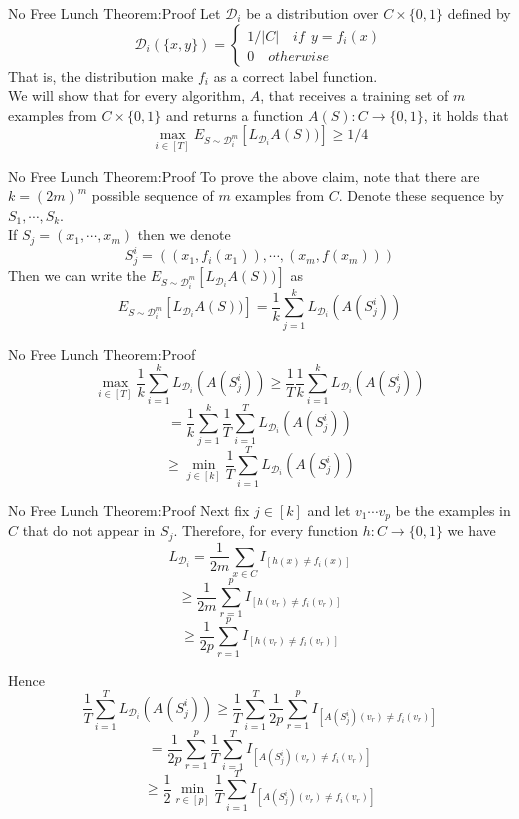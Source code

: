 \documentclass{beamer}
\begin{document}
\begin{frame}{No Free Lunch Theorem:Proof}
	Let $\mathcal{D}_i$ be a distribution over $C \times \{0,1\}$ defined by
	\[\mathcal{D}_i(\{x,y\}) = \begin{cases}
			1/|C| \quad if \ \ y=f_i(x) \\
			0 \quad otherwise
	\end{cases}\]
	That is, the distribution make $f_i$ as a correct label function. \\
	We will show that for every algorithm, $A$, that receives a training set of $m$ examples from $C \times \{0,1\}$ and returns a function $A(S): C \rightarrow \{0,1\}$, it holds that 
\[\max_{i \in [T]} E_{S \sim \mathcal{D}^m_i} [L_{\mathcal{D}_i} A(S))] \geq 1/4\]
\end{frame}
\begin{frame}{No Free Lunch Theorem:Proof}
	To prove the above claim, note that there are $k = (2m)^m$ possible sequence of $m$ examples from $C$. Denote these sequence by $S_1, \cdots, S_k$. \\
	If $S_j = (x_1, \cdots, x_m)$ then we denote 
	\[S_j^i = ((x_1,f_i(x_1)), \cdots, (x_m,f(x_m)) )\]
Then we can write the $E_{S \sim \mathcal{D}^m_i} [L_{\mathcal{D}_i} A(S))]$ as 
\[E_{S \sim \mathcal{D}^m_i} [L_{\mathcal{D}_i} A(S))] = \frac{1}{k} \sum^k_{j=1} L_{\mathcal{D}_i} (A(S^i_j))\]
\end{frame}
\begin{frame}{No Free Lunch Theorem:Proof}
	\[\max_{i \in [T]} \frac{1}{k} \sum^k_{i=1} L_{\mathcal{D}_i} (A(S^i_j)) \geq \frac{1}{T} \frac{1}{k} \sum^k_{i=1} L_{\mathcal{D}_i} (A(S^i_j))\]
	\[= \frac{1}{k} \sum^k_{j=1} \frac{1}{T} \sum^T_{i=1} L_{\mathcal{D}_i} (A(S^i_j))\]
	\[\geq \min_{j \in [k]} \frac{1}{T} \sum^T_{i=1} L_{\mathcal{D}_i}(A(S_j^i))\]
\end{frame}
\begin{frame}{No Free Lunch Theorem:Proof}
	Next fix $j \in [k]$ and let $v_1 \cdots v_p$ be the examples in $C$ that do not appear in $S_j$. Therefore, for every function $h:C \rightarrow \{0,1\}$ we have 
\[L_{\mathcal{D}_i} = \frac{1}{2m} \sum_{x \in C} I_{[h(x) \neq f_i(x)]}\]
\[\geq \frac{1}{2m} \sum^p_{r=1} I_{[h(v_r) \neq f_i(v_r)]}\]
\[\geq \frac{1}{2p} \sum^p_{r=1} I_{[h(v_r) \neq f_i(v_r)]}\]
\end{frame}
\begin{frame}
Hence 
\[\frac{1}{T} \sum^T_{i=1} L_{\mathcal{D}_i}(A(S_j^i)) \geq \frac{1}{T} \sum^T_{i=1}  \frac{1}{2p} \sum^p_{r=1} I_{[A(S^i_j)(v_r) \neq f_i(v_r)]}\]
\[= \frac{1}{2p} \sum^p_{r=1} \frac{1}{T} \sum^T_{i=1} I_{[A(S^i_j)(v_r) \neq f_i(v_r)]}\]
\[\geq \frac{1}{2} \min_{r \in [p]} \frac{1}{T} \sum^T_{i=1} I_{[A(S^i_j)(v_r) \neq f_i(v_r)]}\]
\end{frame}
\end{document}
